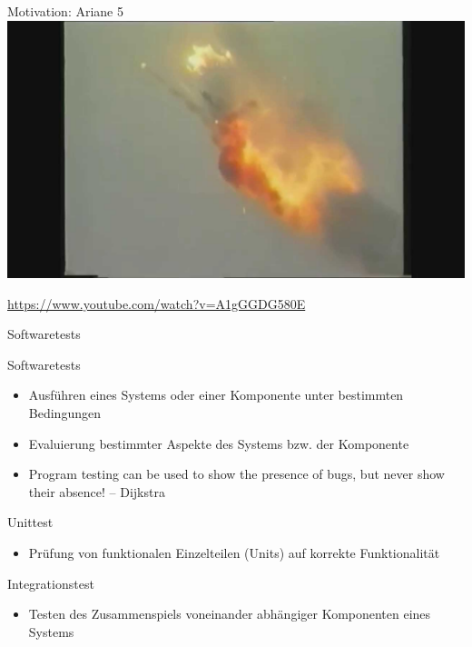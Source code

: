 \documentclass{beamer}
\begin{document}
\begin{frame}{Motivation: Ariane 5}
	\includegraphics[width=\textwidth]{img/ariane5.jpg}

	\url{https://www.youtube.com/watch?v=A1gGGDG580E}
\end{frame}

\begin{frame}{Softwaretests}
	\begin{block}{Softwaretests}
		\begin{itemize}
			\item Ausführen eines Systems oder einer Komponente unter bestimmten Bedingungen
			\item Evaluierung bestimmter Aspekte des Systems bzw. der Komponente
			\item {}Program testing can be used to show the presence of bugs, but never show their absence! -- Dijkstra
		\end{itemize}
	\end{block}
	\pause
	\begin{block}{Unittest}
		\begin{itemize}
			\item Prüfung von funktionalen Einzelteilen (Units) auf korrekte Funktionalität
		\end{itemize}
	\end{block}
	\begin{block}{Integrationstest}
		\begin{itemize}
			\item Testen des Zusammenspiels voneinander abhängiger Komponenten eines Systems
		\end{itemize}
	\end{block}
\end{frame}
\end{document}
